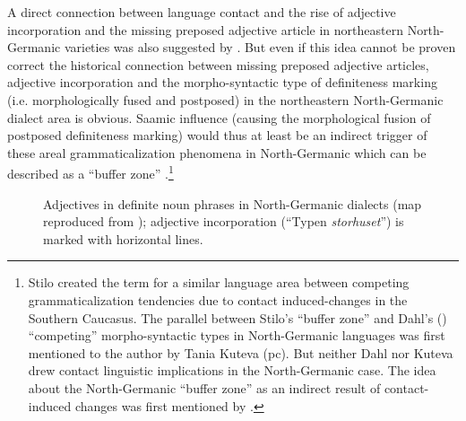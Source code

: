 {A direct connection between language contact and the rise of adjective incorporation and the missing preposed adjective article in northeastern North-Germanic varieties was also suggested by \cite{riesler2001a,riesler2002a}. But even if this idea cannot be proven correct the historical connection between missing preposed adjective articles, adjective incorporation and the morpho-syntactic type of definiteness marking (i.e. morphologically fused and postposed) in the northeastern North-Germanic dialect area is obvious. Saamic influence (causing the morphological fusion of postposed definiteness marking) would thus at least be an indirect trigger of these areal grammaticalization phenomena in North-Germanic which can be described as a “buffer zone” \citep{stilo2005}.\footnote{Stilo created the term for a similar language area between competing grammaticalization tendencies due to contact induced-changes in the Southern Caucasus. The parallel between Stilo's “buffer zone” and Dahl's (\citeyear{dahl2003}) “competing” morpho-syntactic types in North-Germanic languages was first mentioned to the author by Tania Kuteva (pc). But neither Dahl nor Kuteva drew contact linguistic implications in the North-Germanic case. The idea about the North-Germanic “buffer zone” as an indirect result of contact-induced changes was first mentioned by \cite{riesler2006a}.}

\begin{figure}[h]
\caption[Adjectives in definite noun phrases]{Adjectives in definite noun phrases in North-Germanic dialects (map reproduced from \citealt{delsing1996b}); adjective incorporation (“Typen \textit{storhuset}”) is marked with horizontal lines.}
\label{Delsing9}
\end{figure}

}
